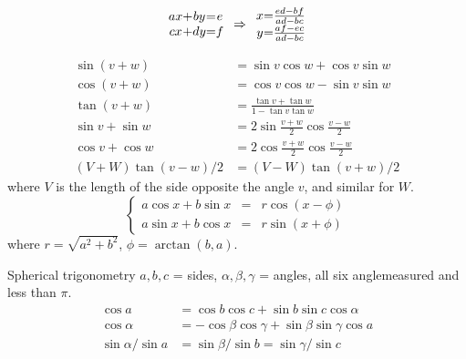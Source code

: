 \clearpage
{}
\categorycontents{}


$$
\begin{array}{c@{+}c@{=}c}
ax & by & e \\
cx & dy & f
\end{array} \Rightarrow
\begin{array}{c@{=}c}
x & \frac{ed-bf}{ad-bc} \\
y & \frac{af-ec}{ad-bc}
\end{array}
$$


\begin{align*}
  \sin(v+w) &= \sin v \cos w + \cos v \sin w \\
  \cos(v+w) &= \cos v \cos w  - \sin v \sin w  \\
  \tan(v+w) &= \frac{\tan v +\tan w }{1-\tan v \tan w }\\
  \sin v +\sin w  &= 2\sin\frac{v+w}{2}\cos\frac{v-w}{2}\\
  \cos v + \cos w & = 2 \cos \frac{v+w}{2} \cos \frac{v-w}{2}\\
  (V+W)\tan (v-w)/2 &= (V-W)\tan (v+w)/2
\end{align*}
where $V$ is the length of the side opposite the angle $v$, and
similar for $W$.
$$
\left\{\begin{array}{rcl}
a\cos x + b \sin x &=& r\cos(x - \phi)\\
a\sin x + b \cos x &=& r\sin(x + \phi)
\end{array}\right.
$$
where $r = \sqrt{a^2+b^2}$, $\phi = \arctan(b,a)$.
\begin{algorithm}{Spherical trigonometry}
\desc
$a,b,c$ = sides, $\alpha, \beta, \gamma$ = angles, all six
anglemeasured and less than $\pi$.
\begin{align*}
  \cos a & = \cos b \cos c + \sin b \sin c \cos \alpha\\
  \cos \alpha & = -\cos \beta \cos \gamma + \sin \beta \sin \gamma \cos a\\
  \sin \alpha / \sin a & = \sin \beta / \sin b = \sin \gamma / \sin c\\
\end{align*}
\end{algorithm}

